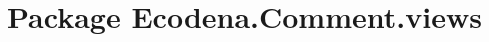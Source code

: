 \hypertarget{namespace_ecodena_1_1_comment_1_1views}{
\section{Package Ecodena.Comment.views}
\label{da/d3b/namespace_ecodena_1_1_comment_1_1views}
}
